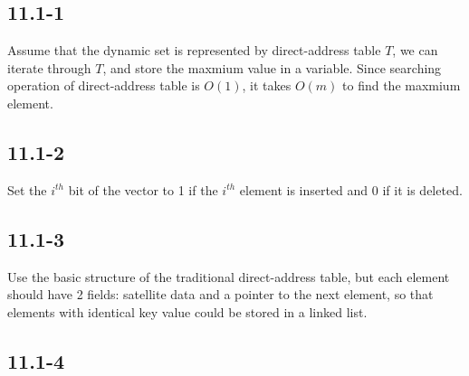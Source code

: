 \subsection{11.1-1}
    Assume that the dynamic set is represented by direct-address table $T$, we
    can iterate through $T$, and store the maxmium value in a variable.  Since
    searching operation of direct-address table is $O(1)$, it takes $O(m)$ to
    find the maxmium element.
\subsection{11.1-2}
    Set the $i^{th}$ bit of the vector to 1 if the $i^{th}$ element is inserted
    and 0 if it is deleted.
\subsection{11.1-3}
    Use the basic structure of the traditional direct-address table, but each
    element should have 2 fields: satellite data and a pointer to the next
    element, so that elements with identical key value could be stored in a
    linked list.
\subsection{11.1-4}
